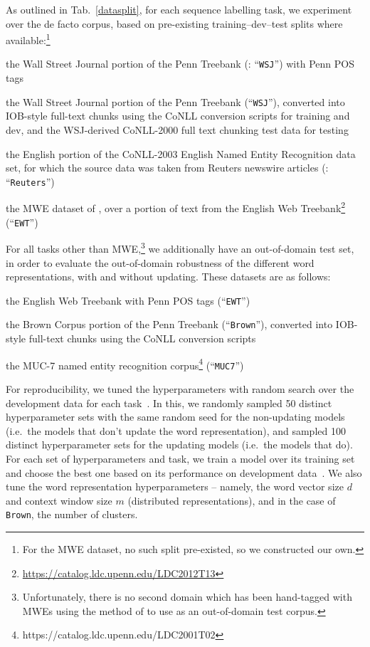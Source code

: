 \documentclass[11pt]{article}
\newcommand{\tabref}[2][]{Tab#1.~\ref{#2}\xspace}
\newcommand{\dataset}[1]{\texttt{#1}\xspace}
\newcommand{\EWT}{\dataset{EWT}}
\newcommand{\WSJ}{\dataset{WSJ}}
\newcommand{\Brown}{\dataset{Brown}}
\newcommand{\Reuters}{\dataset{Reuters}}
\newcommand{\MUC}{\dataset{MUC7}}
\newcommand{\task}[1]{\textsf{#1}\xspace}
\newcommand{\pos}{\task{POS-tagging}}
\newcommand{\chunking}{\task{Chunking}}
\newcommand{\ner}{\task{NER}}
\newcommand{\mwe}{\task{MWE}}
\begin{document}
As outlined in \tabref{datasplit}, for each sequence labelling task, we
experiment over the de facto corpus, based on pre-existing
training--dev--test splits where available:\footnote{For the \mwe
  dataset, no such split pre-existed, so we constructed our own.}
\begin{compactenum}
\item[\textbf{\pos}:] the Wall Street Journal portion of the Penn
  Treebank (: ``\WSJ'')
  with Penn POS tags
\item[\textbf{\chunking}:] the Wall Street Journal portion of the Penn
  Treebank (``\WSJ''),
  converted into IOB-style full-text chunks using the CoNLL conversion
  scripts for training and dev, and the WSJ-derived CoNLL-2000 full text chunking
  test data for testing \cite{TjongKimSang:Buchholz:2000}
\item[\textbf{\ner}:] the English portion of the CoNLL-2003 English Named Entity Recognition
  data set, for which the source data was taken from Reuters newswire
  articles (: ``\Reuters'')
\item[\textbf{\mwe}:] the MWE dataset of , over a portion of text from the
  English Web Treebank\footnote{\url{https://catalog.ldc.upenn.edu/LDC2012T13}} (``\EWT'')
\end{compactenum}
 For all tasks other
than \mwe,\footnote{Unfortunately, there is no
  second domain which has been hand-tagged with MWEs using the method of
   to use as an out-of-domain test corpus.} we
additionally have an out-of-domain test set, in order to evaluate the
out-of-domain robustness of the different word representations, with and
without updating. These datasets are as follows:
\begin{compactenum}
\item[\textbf{\pos}:] the English Web Treebank with Penn POS tags (``\EWT'')
\item[\textbf{\chunking}:] the Brown Corpus portion of the Penn
  Treebank (``\Brown''), 
  converted into IOB-style full-text chunks using the CoNLL conversion
  scripts
\item[\textbf{\ner}:] the MUC-7 named entity recognition corpus\footnote{https://catalog.ldc.upenn.edu/LDC2001T02} (``\MUC'')
\end{compactenum}

For reproducibility, we tuned the hyperparameters with random search
over the development data for each task~\cite{bergstra2012random}. 
In this, we randomly sampled 50 distinct hyperparameter sets with the
same random seed for the non-updating models (i.e.\ the models that
don't update the word representation), and
sampled 100 distinct hyperparameter sets for the updating models (i.e.\
the models that do). 
For each set of hyperparameters and task, we train a model over its
training set and choose the best one based on its performance on development data~\cite{turian2010word}. 
We also tune the word representation hyperparameters -- namely, the word
vector size $d$ and context window size $m$ (distributed
representations), and in the case of \Brown, the number of clusters.
\end{document}
